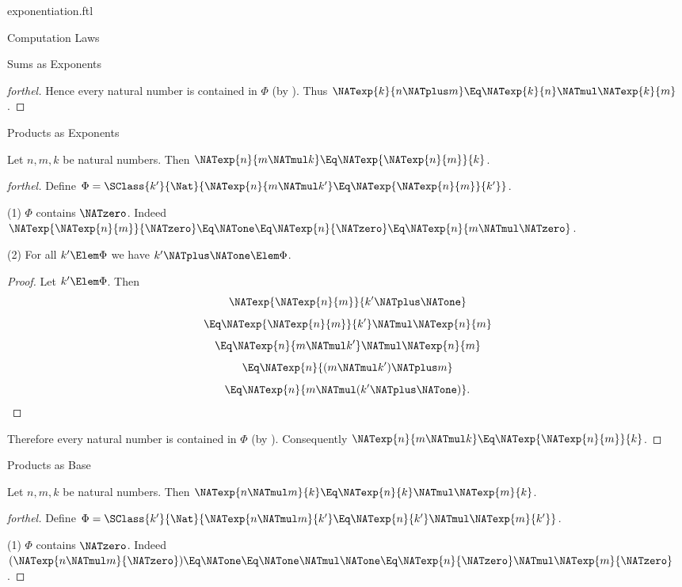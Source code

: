 \documentclass{stex}
\begin{document}
\begin{smodule}{exponentiation.ftl}
\begin{sfragment}{Computation Laws}
\begin{sfragment}{Sums as Exponents}
\begin{proof}[forthel]
      Hence every natural number is contained in $\Phi$ (by ).
      Thus $\NATexp{k}{n \NATplus m} \Eq \NATexp{k}{n} \NATmul \NATexp{k}{m}$.
    \end{proof}
  \end{sfragment}

  \begin{sfragment}{Products as Exponents}
    \begin{proposition}[forthel]
      Let $n, m, k$ be natural numbers.
      Then $\NATexp{n}{m \NATmul k} \Eq \NATexp{\NATexp{n}{m}}{k}$.
    \end{proposition}
    \begin{proof}[forthel]
      Define $\Phi = \SClass{k'}{\Nat}{\NATexp{n}{m \NATmul k'} \Eq \NATexp{\NATexp{n}{m}}{k'}}$.

      (1) $\Phi$ contains $\NATzero$.
      Indeed $\NATexp{\NATexp{n}{m}}{\NATzero}
        \Eq \NATone
        \Eq \NATexp{n}{\NATzero}
        \Eq \NATexp{n}{m \NATmul \NATzero}$.

      (2) For all $k' \Elem \Phi$ we have $k' \NATplus \NATone \Elem \Phi$.
      \begin{proof}
        Let $k' \Elem \Phi$.
        Then
        \[  \NATexp{\NATexp{n}{m}}{k' \NATplus \NATone}                \]
        \[    \Eq \NATexp{\NATexp{n}{m}}{k'} \NATmul \NATexp{n}{m}    \]
        \[    \Eq \NATexp{n}{m \NATmul k'} \NATmul \NATexp{n}{m}  \]
        \[    \Eq \NATexp{n}{(m \NATmul k') \NATplus m}        \]
        \[    \Eq \NATexp{n}{m \NATmul (k' \NATplus \NATone)}.       \]
      \end{proof}

      Therefore every natural number is contained in $\Phi$ (by ).
      Consequently $\NATexp{n}{m \NATmul k} \Eq \NATexp{\NATexp{n}{m}}{k}$.
    \end{proof}
  \end{sfragment}

  \begin{sfragment}{Products as Base}
    \begin{proposition}[forthel]
      Let $n, m, k$ be natural numbers.
      Then $\NATexp{n \NATmul m}{k} \Eq \NATexp{n}{k} \NATmul \NATexp{m}{k}$.
    \end{proposition}
    \begin{proof}[forthel]
      Define $\Phi = \SClass{k'}{\Nat}{\NATexp{n \NATmul m}{k'} \Eq \NATexp{n}{k'} \NATmul \NATexp{m}{k'}}$.

      (1) $\Phi$ contains $\NATzero$.
      Indeed $(\NATexp{n \NATmul m}{\NATzero})
        \Eq \NATone
        \Eq \NATone \NATmul \NATone
        \Eq \NATexp{n}{\NATzero} \NATmul \NATexp{m}{\NATzero}$. %


\end{proof}
\end{sfragment}
\end{sfragment}
\end{smodule}
\end{document}
